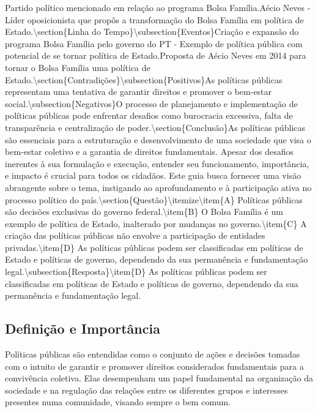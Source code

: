 \documentclass[
   article,       
   12pt,          
   oneside,       
   a4paper,       
   english,       
   brazil,        
   sumario=tradicional
   ]{abntex2}
\begin{document}
Partido político mencionado em relação ao programa Bolsa Família.Aécio Neves - Líder oposicionista que propôs a transformação do Bolsa Família em política de Estado.\textbackslash{}section\{Linha do Tempo\}\textbackslash{}subsection\{Eventos\}Criação e expansão do programa Bolsa Família pelo governo do PT - Exemplo de política pública com potencial de se tornar política de Estado.Proposta de Aécio Neves em 2014 para tornar o Bolsa Família uma política de Estado.\textbackslash{}section\{Contradições\}\textbackslash{}subsection\{Positivos\}As políticas públicas representam uma tentativa de garantir direitos e promover o bem-estar social.\textbackslash{}subsection\{Negativos\}O processo de planejamento e implementação de políticas públicas pode enfrentar desafios como burocracia excessiva, falta de transparência e centralização de poder.\textbackslash{}section\{Conclusão\}As políticas públicas são essenciais para a estruturação e desenvolvimento de uma sociedade que visa o bem-estar coletivo e a garantia de direitos fundamentais. Apesar dos desafios inerentes à sua formulação e execução, entender seu funcionamento, importância, e impacto é crucial para todos os cidadãos. Este guia busca fornecer uma visão abrangente sobre o tema, instigando ao aprofundamento e à participação ativa no processo político do país.\textbackslash{}section\{Questão\}\textbackslash{}itemize\textbackslash{}item\{A\} Políticas públicas são decisões exclusivas do governo federal.\textbackslash{}item\{B\} O Bolsa Família é um exemplo de política de Estado, inalterado por mudanças no governo.\textbackslash{}item\{C\} A criação das políticas públicas não envolve a participação de entidades privadas.\textbackslash{}item\{D\} As políticas públicas podem ser classificadas em políticas de Estado e políticas de governo, dependendo da sua permanência e fundamentação legal.\textbackslash{}subsection\{Resposta\}\textbackslash{}item\{D\} As políticas públicas podem ser classificadas em políticas de Estado e políticas de governo, dependendo da sua permanência e fundamentação legal.


\subsection{Definição e Importância}
Políticas públicas são entendidas como o conjunto de ações e decisões tomadas com o intuito de garantir e promover direitos considerados fundamentais para a convivência coletiva. Elas desempenham um papel fundamental na organização da sociedade e na regulação das relações entre os diferentes grupos e interesses presentes numa comunidade, visando sempre o bem comum.
\end{document}
